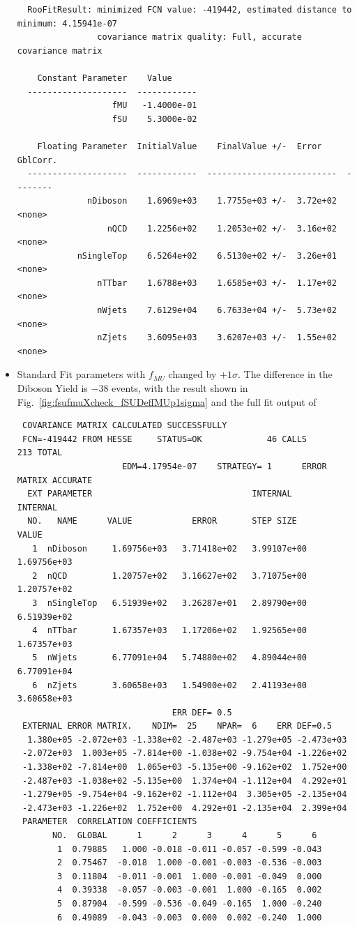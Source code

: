 \begin{itemize}
{\begin{verbatim}
  RooFitResult: minimized FCN value: -419442, estimated distance to minimum: 4.15941e-07
                covariance matrix quality: Full, accurate covariance matrix

    Constant Parameter    Value     
  --------------------  ------------
                   fMU   -1.4000e-01
                   fSU    5.3000e-02

    Floating Parameter  InitialValue    FinalValue +/-  Error     GblCorr.
  --------------------  ------------  --------------------------  --------
              nDiboson    1.6969e+03    1.7755e+03 +/-  3.72e+02  <none>
                  nQCD    1.2256e+02    1.2053e+02 +/-  3.16e+02  <none>
            nSingleTop    6.5264e+02    6.5130e+02 +/-  3.26e+01  <none>
                nTTbar    1.6788e+03    1.6585e+03 +/-  1.17e+02  <none>
                nWjets    7.6129e+04    6.7633e+04 +/-  5.73e+02  <none>
                nZjets    3.6095e+03    3.6207e+03 +/-  1.55e+02  <none>

\end{verbatim}
}


\item Standard Fit parameters with $f_{MU}$ changed by $+1\sigma$. The difference in the Diboson Yield is $-38$ events, with the result shown in Fig.~\ref{fig:fsufmuXcheck_fSUDeffMUp1sigma} and the full fit output of
{\tiny
\begin{verbatim}
 COVARIANCE MATRIX CALCULATED SUCCESSFULLY
 FCN=-419442 FROM HESSE     STATUS=OK             46 CALLS         213 TOTAL
                     EDM=4.17954e-07    STRATEGY= 1      ERROR MATRIX ACCURATE 
  EXT PARAMETER                                INTERNAL      INTERNAL  
  NO.   NAME      VALUE            ERROR       STEP SIZE       VALUE   
   1  nDiboson     1.69756e+03   3.71418e+02   3.99107e+00   1.69756e+03
   2  nQCD         1.20757e+02   3.16627e+02   3.71075e+00   1.20757e+02
   3  nSingleTop   6.51939e+02   3.26287e+01   2.89790e+00   6.51939e+02
   4  nTTbar       1.67357e+03   1.17206e+02   1.92565e+00   1.67357e+03
   5  nWjets       6.77091e+04   5.74880e+02   4.89044e+00   6.77091e+04
   6  nZjets       3.60658e+03   1.54900e+02   2.41193e+00   3.60658e+03
                               ERR DEF= 0.5
 EXTERNAL ERROR MATRIX.    NDIM=  25    NPAR=  6    ERR DEF=0.5
  1.380e+05 -2.072e+03 -1.338e+02 -2.487e+03 -1.279e+05 -2.473e+03 
 -2.072e+03  1.003e+05 -7.814e+00 -1.038e+02 -9.754e+04 -1.226e+02 
 -1.338e+02 -7.814e+00  1.065e+03 -5.135e+00 -9.162e+02  1.752e+00 
 -2.487e+03 -1.038e+02 -5.135e+00  1.374e+04 -1.112e+04  4.292e+01 
 -1.279e+05 -9.754e+04 -9.162e+02 -1.112e+04  3.305e+05 -2.135e+04 
 -2.473e+03 -1.226e+02  1.752e+00  4.292e+01 -2.135e+04  2.399e+04 
 PARAMETER  CORRELATION COEFFICIENTS  
       NO.  GLOBAL      1      2      3      4      5      6
        1  0.79885   1.000 -0.018 -0.011 -0.057 -0.599 -0.043
        2  0.75467  -0.018  1.000 -0.001 -0.003 -0.536 -0.003
        3  0.11804  -0.011 -0.001  1.000 -0.001 -0.049  0.000
        4  0.39338  -0.057 -0.003 -0.001  1.000 -0.165  0.002
        5  0.87904  -0.599 -0.536 -0.049 -0.165  1.000 -0.240
        6  0.49089  -0.043 -0.003  0.000  0.002 -0.240  1.000


\end{verbatim}}
\end{itemize}
